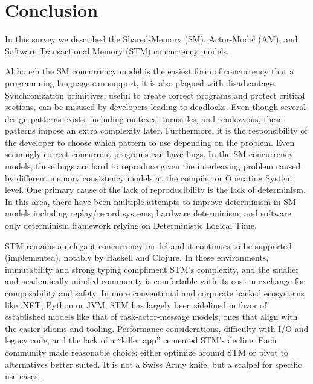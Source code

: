 \section{Conclusion\label{sec:conclusion}}
In this survey we described the Shared-Memory (SM),
Actor-Model (AM), and Software Transactional Memory (STM)
concurrency models.

Although the SM concurrency model is the
easiest form of concurrency that a programming language
can support, it is also plagued with disadvantage.
Synchronization primitives, useful to create
correct programs and protect critical sections, can be
misused by developers leading to deadlocks. Even though
several design patterns exists, including mutexes, turnstiles,
and rendezvous, these patterns impose an extra
complexity later. Furthermore, it is
the responsibility
of the developer to choose which pattern to use depending
on the problem. Even seemingly correct concurrent programs
can have bugs. In the SM concurrency models, these bugs
are hard to reproduce given the interleaving problem
caused by different memory consistency models at the compiler
or Operating System level. One primary cause of the lack
of reproducibility is the lack of determinism. In this area, there
have been multiple attempts to improve determinism in SM models
including replay/record systems, hardware determinism,
and software only determinism framework relying on 
Deterministic Logical Time.

STM remains an elegant concurrency model and it
continues to be supported (implemented), notably by Haskell and Clojure.
In these environments, immutability and strong typing compliment STM’s complexity,
and the smaller and academically minded community is comfortable with its cost
in exchange for composability and safety. In more conventional and corporate
backed ecosystems like .NET, Python or JVM, STM has largely been sidelined
in favor of established models like that of task-actor-message models;
ones that align with the easier idioms and tooling.
Performance considerations, difficulty with I/O and legacy code,
and the lack of a “killer app” cemented STM’s decline.
Each community made reasonable choice: either optimize
around STM or pivot to alternatives better suited.
It is not a Swiss Army knife, but a scalpel for specific use cases.

